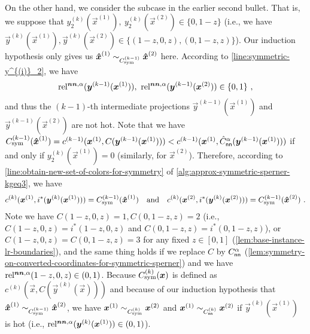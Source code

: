 \paragraph{~~}
On the other hand, we consider the subcase in the earlier second bullet. That is, we suppose that $y^{(k)}_2(\vec{x}^{(1)}),\ y^{(k)}_2(\vec{x}^{(2)}) \in \{0,1-z\}$ (i.e., we have $\vec{y}^{(k)}(\vec{x}^{(1)}), \vec{y}^{(k)}(\vec{x}^{(2)})\in \{(1-z,0,z), (0,1-z,z)\}$).
Our induction hypothesis only gives us $\vec{\hat{x}}^{(1)}\sim_{\Csym{k-1}}\vec{\hat{x}}^{(2)}$ here. 
According to \cref{line:symmetric-y^{(i)}_2}, we have 
\begin{align*}
    \rela(\vec{y}^{(k-1)}(\vec{x}^{(1)})),\ \rela(\vec{y}^{(k-1)}(\vec{x}^{(2)}))\in \{0,1\}~,
\end{align*} 
and thus the $(k-1)$-th intermediate projections $\vec{y}^{(k-1)}(\vec{x}^{(1)})$ and $\vec{y}^{(k-1)}(\vec{x}^{(2)})$ are not hot.
Note that we have $\Csym{k-1}(\vec{\hat{x}}^{(1)}) = c^{(k-1)}(\vec{x}^{(1)}, C(\vec{y}^{(k-1)}(\vec{x}^{(1)})))<c^{(k-1)}(\vec{x}^{(1)}, \hat{C}^{\alpha}_{\sf nn}(\vec{y}^{(k-1)}(\vec{x}^{(1)})))$ if and only if $y_2^{(k)}(\vec{x}^{(1)})=0$ (similarly, for $\vec{x}^{(2)}$).
Therefore, according to \cref{line:obtain-new-set-of-colors-for-symmetry} of \cref{alg:approx-symmetric-sperner-kgeq3}, we have
\begin{align*}
 c^{(k)}(\vec{x}^{(1)}, i^*(\vec{y}^{(k)}(\vec{x}^{(1)})))=\Csym{k-1}(\vec{\hat{x}}^{(1)}) 
 \quad \text{and} \quad 
 c^{(k)}(\vec{x}^{(2)}, i^*(\vec{y}^{(k)}(\vec{x}^{(2)})))=\Csym{k-1}(\vec{\hat{x}}^{(2)})~.
\end{align*}
Note we have $C(1-z,0,z)=1,C(0,1-z,z)=2$ (i.e., $C(1-z,0,z)=i^*(1-z,0,z)$ and $C(0,1-z,z)=i^*(0,1-z,z)$), or $C(1-z,0,z)=C(0,1-z,z)=3$ for any fixed $z\in [0,1]$ (\cref{lem:base-instance-lr-boundaries}), and the same thing holds if we replace $C$ by $C_{\sf nn}^{\alpha}$ (\cref{lem:symmetry-on-converted-coordinates-for-symmetric-sperner}) and we have $\rela(1-z,0,z)\in (0,1)$.
Because $\Csym{k}(\vec{x})$ is defined as $c^{(k)}(\vec{x}, C(\vec{y}^{(k)}(\vec{x})))$ and because of our induction hypothesis that $\vec{\hat{x}}^{(1)} \sim_{\Csym{k-1}} \vec{\hat{x}}^{(2)}$, we have $\vec{x}^{(1)} \sim_{\Csym{k}} \vec{x}^{(2)}$ and $\vec{x}^{(1)} \sim_{C^{(k)}_{\sf nn}} \vec{x}^{(2)}$ if $\vec{y}^{(k)}(\vec{x}^{(1)})$ is hot (i.e., $\rela(\vec{y}^{(k)}(\vec{x}^{(1)}))\in (0,1)$).



